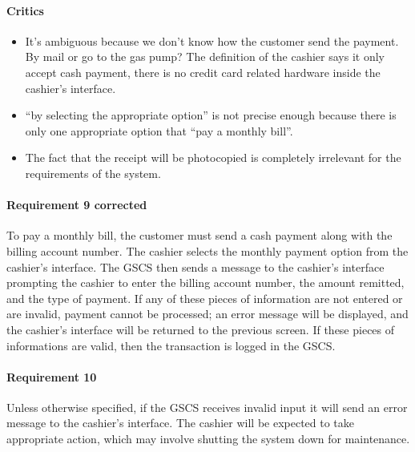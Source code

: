 \begin{framed}
    \paragraph{Critics}
    \begin{itemize}
        \item It's ambiguous because we don't know how the customer send
            the payment. By mail or go to the gas pump? The definition of the
            cashier says it only accept cash payment, there is no credit card
            related hardware inside the cashier's interface.

        \item \enquote{by selecting the appropriate option} is not precise
            enough because there is only one appropriate option that
            \enquote{pay a monthly bill}.

        \item The fact that the receipt will be photocopied is
            completely irrelevant for the requirements of the system.
    \end{itemize}

    \paragraph{Requirement 9 corrected} To pay a monthly bill, the customer must send
    a cash payment along with the billing account number. The cashier selects
    the monthly payment option from the
    cashier's interface. The GSCS then sends a message to the cashier's interface
    prompting the cashier to enter the billing account number, the amount
    remitted, and the type of payment. If any of these pieces of information
    are not entered or are invalid, payment cannot be processed; an error
    message will be displayed, and the cashier's interface will be returned
    to the previous screen. If these pieces of informations are valid, then the
    transaction is logged in the GSCS.\@
\end{framed}

\paragraph{Requirement 10} Unless otherwise specified, if the GSCS receives
invalid input it will send an error message to the cashier's interface.
The cashier will be expected to take appropriate action, which may
involve shutting the system down for maintenance.

